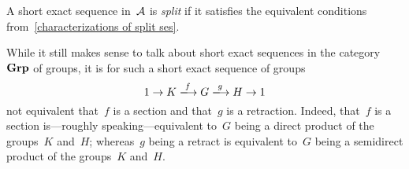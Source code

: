 

\begin{definition*}
  A short exact sequence in~$\mathcal{A}$ is \emph{split} if it satisfies the equivalent conditions from~\cref{characterizations of split ses}.
\end{definition*}


\begin{warning*}
  While it still makes sense to talk about short exact sequences in the category~$\mathbf{Grp}$ of groups, it is for such a short exact sequence of groups
  \[
    1
    \to
    K
    \xlongto{f}
    G
    \xlongto{g}
    H
    \to
    1
  \]
  not equivalent that~$f$ is a section and that~$g$ is a retraction.
  Indeed, that~$f$ is a section is---roughly speaking---equivalent to~$G$ being a direct product of the groups~$K$ and~$H$;
  whereas~$g$ being a retract is equivalent to~$G$ being a semidirect product of the groups~$K$ and~$H$.
\end{warning*}


